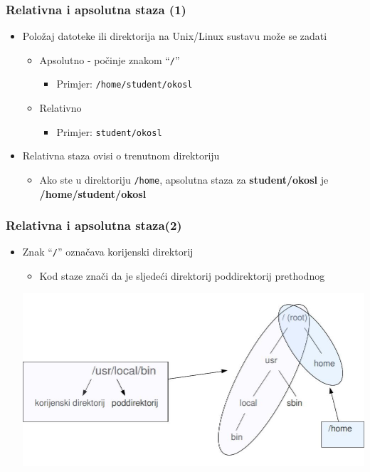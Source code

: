 \documentclass{beamer}
\newcommand{\shell}[1]{\texttt{\small #1}}
\begin{document}
\begin{frame}[t]
\frametitle{Relativna i apsolutna staza (1)}
\begin{itemize}
  \item Položaj datoteke ili direktorija na Unix/Linux sustavu može se 
        zadati
  \begin{itemize}
    \item Apsolutno - počinje znakom ``\texttt{/}''
    \begin{itemize}
      \item[] Primjer: \texttt{/home/student/okosl}
    \end{itemize}
    \item Relativno 
    \begin{itemize}
      \item[] Primjer: \texttt{student/okosl}
    \end{itemize}
  \end{itemize}

  \item Relativna staza ovisi o trenutnom direktoriju
  \begin{itemize}
    \item Ako ste u direktoriju \shell{/home}, apsolutna staza za
          \textbf{student/okosl} je \textbf{/home/student/okosl}
  \end{itemize}
\end{itemize}
\end{frame}

\begin{frame}[t]
\frametitle{Relativna i apsolutna staza(2)}
\begin{itemize}
  \item Znak ``\texttt{/}'' označava korijenski direktorij
  \begin{itemize}
    \item Kod staze znači da je sljedeći direktorij poddirektorij
          prethodnog
  \end{itemize}
  \centering
  \includegraphics[scale=0.3]{filetree_detail}
\end{itemize}
\end{frame}
\end{document}

